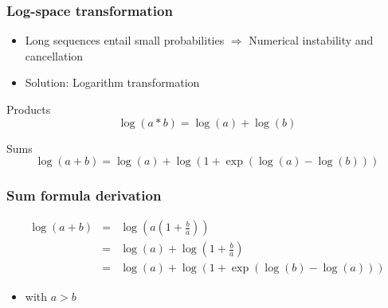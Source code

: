 \documentclass{beamer}[12pt]
\begin{document}
\begin{frame}
	\frametitle{Log-space transformation}
	\begin{itemize}
		\item Long sequences entail small probabilities $\Rightarrow$ Numerical instability and cancellation
		\item Solution: Logarithm transformation
	\end{itemize}
	\begin{block}{Products}
		\begin{displaymath}
			\log(a*b) = \log(a)+\log(b)
		\end{displaymath}
	\end{block}
	
	\begin{block}{Sums}
		\begin{displaymath}
			\log(a+b) = \log(a) + \log\left(1 + \exp\left(\log(a)-\log(b)\right)\right)
		\end{displaymath}
	\end{block}
\end{frame}

\begin{frame}
	\frametitle{Sum formula derivation}
	
	\begin{eqnarray*}
		\log(a+b) &=& \log\left(a(1+\frac{b}{a}) \right)\\
			&=& \log(a) + \log(1+\frac{b}{a})\\
			&=& \log(a) + \log(1+\exp\left( \log(b) - \log(a) \right))
	\end{eqnarray*}
	\begin{itemize}
		\item with $a>b$
	\end{itemize}
\end{frame}
\end{document}
